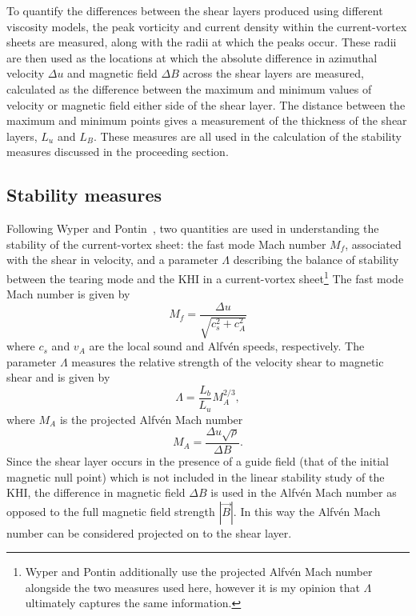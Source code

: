 To quantify the differences between the shear layers produced using different viscosity models, the peak vorticity and current density within the current-vortex sheets are measured, along with the radii at which the peaks occur. These radii are then used as the locations at which the absolute difference in azimuthal velocity $\Delta u$ and magnetic field $\Delta B$ across the shear layers are measured, calculated as the difference between the maximum and minimum values of velocity or magnetic field either side of the shear layer. The distance between the maximum and minimum points gives a measurement of the thickness of the shear layers, $L_u$ and $L_B$. These measures are all used in the calculation of the stability measures discussed in the proceeding section.

\subsection{Stability measures}

\label{sec:stability_measures}

Following Wyper and Pontin~\cite{wyperKelvinHelmholtzInstabilityCurrentvortex2013}, two quantities are used in understanding the stability of the current-vortex sheet: the fast mode Mach number $M_f$, associated with the shear in velocity, and a parameter $\Lambda$ describing the balance of stability between the tearing mode and the KHI in a current-vortex sheet\footnote{Wyper and Pontin additionally use the projected Alfv\'en Mach number alongside the two measures used here, however it is my opinion that $\Lambda$ ultimately captures the same information.} The fast mode Mach number is given by
\begin{equation}
  \label{eq:mach_numbers}
  M_f = \frac{\Delta u}{\sqrt{c_s^2 + c_A^2}}
\end{equation}
where $c_s$ and $v_A$ are the local sound and Alfv\'en speeds, respectively. The parameter $\Lambda$ measures the relative strength of the velocity shear to magnetic shear and is given by
\begin{equation}
  \label{eq:khi_stability_param}
  \Lambda = \frac{L_b}{L_u} M_A^{2/3},
\end{equation}
where $M_A$ is the projected Alfv\'en Mach number
\begin{equation}
  \label{eq:alfven_mach_number}
M_A = \frac{\Delta u \sqrt{\rho}}{\Delta B}.
\end{equation}
Since the shear layer occurs in the presence of a guide field (that of the initial magnetic null point) which is not included in the linear stability study of the KHI, the difference in magnetic field $\Delta B$ is used in the Alfv\'en Mach number as opposed to the full magnetic field strength $|\vec{B}|$. In this way the Alfv\'en Mach number can be considered projected on to the shear layer. 


